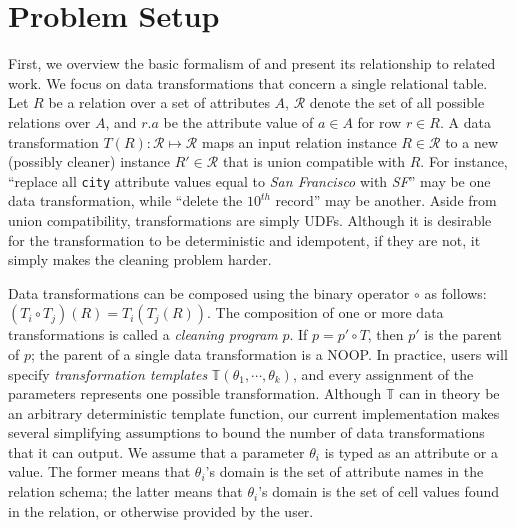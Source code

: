 \section{Problem Setup}
First, we overview the basic formalism of \sys and present its relationship to related work.
We focus on data transformations that concern a single relational table. 
Let $R$ be a relation over a set of attributes $A$,  $\mathcal{R}$ denote the set of all possible relations over $A$, and $r.a$ be the attribute value of $a \in A$ for row $r \in R$.
A data transformation $T(R): \mathcal{R} \mapsto \mathcal{R}$ maps an input relation instance $R \in \mathcal{R}$ to a new (possibly cleaner) instance $R' \in \mathcal{R}$ that is union compatible with $R$.  For instance, ``replace all \texttt{city} attribute values equal to {\it San Francisco} with {\it SF}'' may be one data transformation, while ``delete the $10^{th}$ record'' may be another.   
Aside from union compatibility, transformations are simply UDFs.
Although it is desirable for the transformation to be deterministic and idempotent, if they are not, it simply makes the cleaning problem harder.

Data transformations can be composed using the binary operator $\circ$ as follows: $(T_i \circ T_j)(R) =  T_i(T_j(R))$.
The composition of one or more data transformations is called a {\it cleaning program} $p$.   If $p = p' \circ T$, then $p'$ is the parent of $p$; the parent of a single data transformation is a NOOP.  In practice, users will specify {\it transformation templates} $\mathbb{T}(\theta_1,\cdots,\theta_k)$, and every assignment of the parameters represents one possible transformation.  
Although $\mathbb{T}$ can in theory be an arbitrary deterministic template function, our current implementation makes several simplifying assumptions to bound the number of data transformations that it can output.  We assume that a parameter $\theta_i$ is typed as an attribute or a value.  The former means that $\theta_i$'s domain is the set of attribute names in the relation schema; the latter means that $\theta_i$'s domain is the set of cell values found in the relation, or otherwise provided by the user. 

